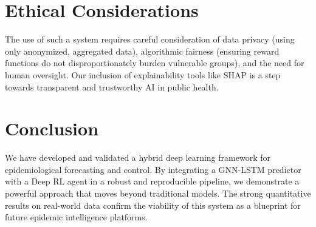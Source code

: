 \documentclass[10pt, a4paper, twocolumn]{article}
\begin{document}
\section{Ethical Considerations}
The use of such a system requires careful consideration of data privacy (using only anonymized, aggregated data), algorithmic fairness (ensuring reward functions do not disproportionately burden vulnerable groups), and the need for human oversight. Our inclusion of explainability tools like SHAP is a step towards transparent and trustworthy AI in public health.

\section{Conclusion}
We have developed and validated a hybrid deep learning framework for epidemiological forecasting and control. By integrating a GNN-LSTM predictor with a Deep RL agent in a robust and reproducible pipeline, we demonstrate a powerful approach that moves beyond traditional models. The strong quantitative results on real-world data confirm the viability of this system as a blueprint for future epidemic intelligence platforms.
\end{document}

